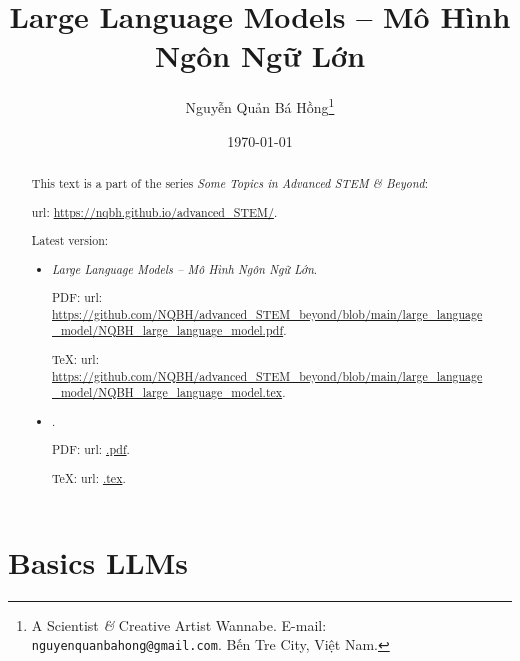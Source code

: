 \documentclass{article}
\title{Large Language Models -- Mô Hình Ngôn Ngữ Lớn}
\author{Nguyễn Quản Bá Hồng\footnote{A Scientist {\it\&} Creative Artist Wannabe. E-mail: {\tt nguyenquanbahong@gmail.com}. Bến Tre City, Việt Nam.}}
\date{\today}
\begin{document}
\maketitle
\begin{abstract}
	This text is a part of the series {\it Some Topics in Advanced STEM \& Beyond}:
	
	{\sc url}: \url{https://nqbh.github.io/advanced_STEM/}.
	
	Latest version:
	\begin{itemize}
		\item {\it Large Language Models -- Mô Hình Ngôn Ngữ Lớn}.
		
		PDF: {\sc url}: \url{https://github.com/NQBH/advanced_STEM_beyond/blob/main/large_language_model/NQBH_large_language_model.pdf}.
		
		\TeX: {\sc url}: \url{https://github.com/NQBH/advanced_STEM_beyond/blob/main/large_language_model/NQBH_large_language_model.tex}.
		\item {\it }.
		
		PDF: {\sc url}: \url{.pdf}.
		
		\TeX: {\sc url}: \url{.tex}.
	\end{itemize}
\end{abstract}
\tableofcontents


\section{Basics LLMs}
\end{document}
